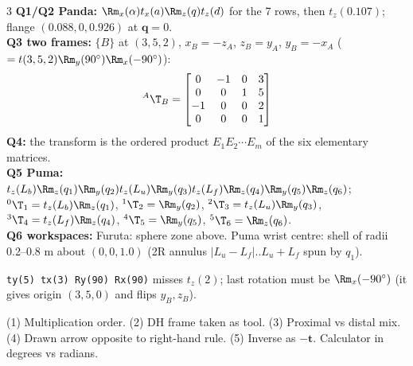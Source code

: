 \begin{multicols}{3}
\textbf{Q1/Q2 Panda:} $\Rm_x(\alpha)t_x(a)\Rm_z(q)t_z(d)$ for the 7 rows, then $t_z(0.107)$; flange $(0.088,0,0.926)$ at $\mathbf q=0$. \chk\\
\textbf{Q3 two frames:} $\{B\}$ at $(3,5,2)$, $x_B=-z_A$, $z_B=y_A$, $y_B=-x_A$ ($=t(3,5,2)\Rm_y(90^\circ)\Rm_x(-90^\circ)$):
\[{}^A\T_B=\begin{bmatrix}0&-1&0&3\\0&0&1&5\\-1&0&0&2\\0&0&0&1\end{bmatrix}\]
\textbf{Q4:} the transform is the ordered product $E_1E_2\cdots E_m$ of the six elementary matrices.\\
\textbf{Q5 Puma:} $t_z(L_b)\Rm_z(q_1)\Rm_y(q_2)t_z(L_u)\Rm_y(q_3)t_z(L_f)\Rm_z(q_4)\Rm_y(q_5)\Rm_z(q_6)$; ${}^0\T_1=t_z(L_b)\Rm_z(q_1)$, ${}^1\T_2=\Rm_y(q_2)$, ${}^2\T_3=t_z(L_u)\Rm_y(q_3)$, ${}^3\T_4=t_z(L_f)\Rm_z(q_4)$, ${}^4\T_5=\Rm_y(q_5)$, ${}^5\T_6=\Rm_z(q_6)$. \chk\\
\textbf{Q6 workspaces:} Furuta: sphere zone above. Puma wrist centre: shell of radii 0.2--0.8 m about $(0,0,1.0)$ (2R annulus $|L_u{-}L_f|$..$L_u{+}L_f$ spun by $q_1$). \chk
\begin{slideerr}
\texttt{ty(5) tx(3) Ry(90) Rx(90)} misses $t_z(2)$; last rotation must be $\Rm_x(-90^\circ)$ (it gives origin $(3,5,0)$ and flips $y_B,z_B$). \chk
\end{slideerr}

\begin{trap}
(1) Multiplication order. (2) DH frame taken as tool. (3) Proximal vs distal mix. (4) Drawn arrow opposite to right-hand rule. (5) Inverse as $-\mathbf t$. Calculator in degrees vs radians.
\end{trap}


\end{multicols}
